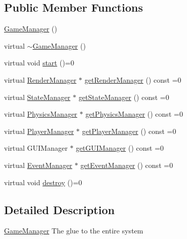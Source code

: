 \subsection*{Public Member Functions}
\begin{DoxyCompactItemize}
\item 
\hyperlink{class_micro_f_p_s_1_1_game_manager_ac51554cf7901660c82e9e706121e6711}{GameManager} ()
\item 
virtual \hyperlink{class_micro_f_p_s_1_1_game_manager_aade03d5fb5ef9c9474188fbb9a0a033a}{$\sim$GameManager} ()
\item 
virtual void \hyperlink{class_micro_f_p_s_1_1_game_manager_afce01403245a9266642fb609c3dd18de}{start} ()=0
\item 
virtual \hyperlink{class_micro_f_p_s_1_1_render_manager}{RenderManager} $\ast$ \hyperlink{class_micro_f_p_s_1_1_game_manager_ac8792976d8d44730864afb866f7ce7cc}{getRenderManager} () const =0
\item 
virtual \hyperlink{class_micro_f_p_s_1_1_state_manager}{StateManager} $\ast$ \hyperlink{class_micro_f_p_s_1_1_game_manager_ac8e2bed71b241e8e0463bdeb9175d844}{getStateManager} () const =0
\item 
virtual \hyperlink{class_micro_f_p_s_1_1_physics_manager}{PhysicsManager} $\ast$ \hyperlink{class_micro_f_p_s_1_1_game_manager_a5f7ba66d79351b6a3ce66c818ed73433}{getPhysicsManager} () const =0
\item 
virtual \hyperlink{class_micro_f_p_s_1_1_player_manager}{PlayerManager} $\ast$ \hyperlink{class_micro_f_p_s_1_1_game_manager_a3288e396a727930d38c037be168e7d38}{getPlayerManager} () const =0
\item 
virtual GUIManager $\ast$ \hyperlink{class_micro_f_p_s_1_1_game_manager_a5b7f578a90a5f92611f9072082414b1f}{getGUIManager} () const =0
\item 
virtual \hyperlink{class_micro_f_p_s_1_1_event_manager}{EventManager} $\ast$ \hyperlink{class_micro_f_p_s_1_1_game_manager_a74fa3acc28f45af0742c8a85cd160bf5}{getEventManager} () const =0
\item 
virtual void \hyperlink{class_micro_f_p_s_1_1_game_manager_a8f221cc845ea6e43dfa23d7f4c90cb4c}{destroy} ()=0
\end{DoxyCompactItemize}


\subsection{Detailed Description}
\hyperlink{class_micro_f_p_s_1_1_game_manager}{GameManager} The glue to the entire system 

